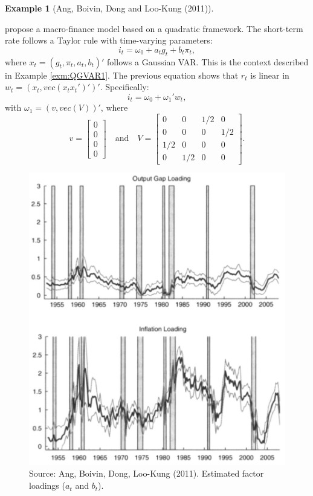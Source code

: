 \documentclass[
  12pt,
]{book}
\theoremstyle{definition}
\theoremstyle{definition}
\newtheorem{example}{Example}[chapter]
\theoremstyle{definition}
\theoremstyle{definition}
\theoremstyle{remark}
\begin{document}
\begin{example}[Ang, Boivin, Dong and Loo-Kung (2011)]
\protect\hypertarget{exm:Angetal2011}{}\label{exm:Angetal2011}

\citet{Ang_Boivin_Dong_LooKung_2011} propose a macro-finance model based on a quadratic framework. The short-term rate follows a Taylor rule with time-varying parameters:
\[
i_t = \omega_0 + a_t g_t + b_t \pi_t,
\]
where \(x_t=(g_t,\pi_t,a_t,b_t)'\) follows a Gaussian VAR. This is the context described in Example \ref{exm:QGVAR1}. The previous equation shows that \(r_t\) is linear in \(w_t = (x_t,vec(x_t x_t')')'\). Specifically:
\[
i_t = \omega_0 + \omega_1'w_t,
\]
with \(\omega_1 = (v,vec(V))'\), where
\[
v = \left[
\begin{array}{c}
0\\
0\\
0\\
0
\end{array}
\right] \quad \mbox{and} \quad V = \left[
\begin{array}{cccc}
0 & 0& 1/2&0\\
0& 0& 0&1/2\\
1/2& 0& 0&0\\
0&1/2 &0 &0
\end{array}
\right].
\]

\begin{figure}

{\centering \includegraphics[width=0.7\linewidth]{figures/Ang_Boivin_loadings} 

}

\caption{Source: Ang, Boivin, Dong, Loo-Kung (2011). Estimated factor loadings ($a_t$ and $b_t$).}\label{fig:AngBoivin}
\end{figure}

\end{example}
\end{document}
